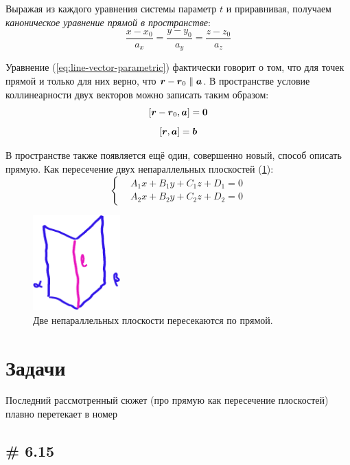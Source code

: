 \documentclass[a4paper,12pt]{article}
\begin{document}
  Выражая из каждого уравнения системы параметр $t$ и приравнивая, получаем \emph{каноническое уравнение прямой в пространстве}:
  \[
    \frac{x - x_0}{a_x} = \frac{y - y_0}{a_y} = \frac{z - z_0}{a_z}
  \]
  
  Уравнение (\ref{eq:line-vector-parametric}) фактически говорит о том, что для точек прямой и только для них верно, что $\bds r - \bds r_0 \hm\parallel \bds a$.
  В пространстве условие коллинеарности двух векторов можно записать таким образом:
  \[
    [\boldsymbol r - \boldsymbol r_0, \boldsymbol a] = \boldsymbol 0
  \]
  \[
    [\boldsymbol r, \boldsymbol a] = \boldsymbol b
  \]
  
  В пространстве также появляется ещё один, совершенно новый, способ описать прямую.
  Как пересечение двух непараллельных плоскостей (\ref{fig:two-planes-have-something-in-common}):
  \begin{equation}\label{eq:line-as-plane-intersection}
    \boxed{
      \left\{
        \begin{aligned}
          &A_1 x + B_1 y + C_1 z + D_1 = 0\\
          &A_2 x + B_2 y + C_2 z + D_2 = 0
        \end{aligned}
      \right.
    }
  \end{equation}
  
  \begin{figure}[h]
    \centering
    
    \includegraphics[width=0.3\textwidth]{two-planes-have-something-in-common}
    
    \caption{Две непараллельных плоскости пересекаются по прямой.}
    \label{fig:two-planes-have-something-in-common}
  \end{figure}
  
  
  \section{Задачи}
  
  Последний рассмотренный сюжет (про прямую как пересечение плоскостей) плавно перетекает в номер
  
  \subsection{\# 6.15}
  
\end{document}
